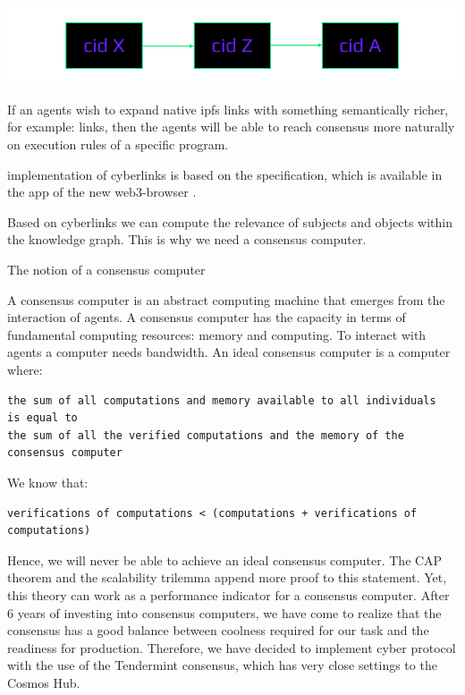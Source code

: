 \documentclass[8pt,oneside]{amsart}
\makeatletter
\newcommand{\linkred}[2]{\href{#1}{\color{red}{#2}}}
\newcommand{\linkgreen}[2]{\href{#1}{\color{green}{#2}}}
\renewcommand\subsection{\@startsection{subsection}
                                    {2}{\z@}
                                    {-3.25ex\@plus -1ex \@minus -.2ex}
                                    {0ex \@plus .2ex}
                                    {\play\Large}
                        }
\newcommand{\titleSection}[1]{\subsection{#1}}
\newenvironment{Figure}
  {\par\medskip\noindent\minipage{\linewidth}}
  {\endminipage\par\medskip}
\makeatother
\begin{document}
\begin{Figure}
    \centering
    \includegraphics[width=1\textwidth]{linkchain.png}
\end{Figure}

If an agents wish to expand native ipfs links with something semantically richer, for example:
\linkred{https://github.com/cybercongress/cyb/blob/dev/docs/dura.md}{DURA}
links, then the agents will be able to reach consensus more naturally on execution rules of a specific program.

\linkred{https://github.com/cybercongress/cyberd}{cyber} implementation of {cyberlinks} is based on the \linkred{https://github.com/cybercongress/cyb/blob/dev/docs/dura.md}{DURA} specification, which is available in the \linkred{https://github.com/cybercongress/.cyber}{.cyber} app of the new web3-browser \linkred{https://github.com/cybercongress/cyb}{cyb}.

Based on cyberlinks we can compute the relevance of subjects and objects within the knowledge graph. This is why we need a consensus computer.

\titleSection{The notion of a consensus computer}\label{The notion of a consensus computer}

A consensus computer is an abstract computing machine that emerges from the interaction of agents. A consensus computer has the capacity in terms of fundamental computing resources: memory and computing. To interact with agents a computer needs bandwidth. An ideal consensus computer is a computer where:
\\
\begin{lstlisting}
the sum of all computations and memory available to all individuals
is equal to
the sum of all the verified computations and the memory of the consensus computer
\end{lstlisting}

We know that:

\begin{lstlisting}
verifications of computations < (computations + verifications of computations)
\end{lstlisting}

Hence, we will never be able to achieve an ideal consensus computer. The CAP theorem and the scalability trilemma append more proof to this statement. Yet, this theory can work as a performance indicator for a consensus computer. After 6 years of investing into consensus computers, we have come to realize that the \linkgreen{https://ipfs.io/ipfs/QmaMtD7xDgghqgjN62zWZ5TBGFiEjGQtuZBjJ9sMh816KJ}{Tendermint} consensus has a good balance between coolness required for our task and the readiness for production. Therefore, we have decided to implement cyber protocol with the use of the Tendermint consensus, which has very close settings to the Cosmos Hub.
\end{document}
